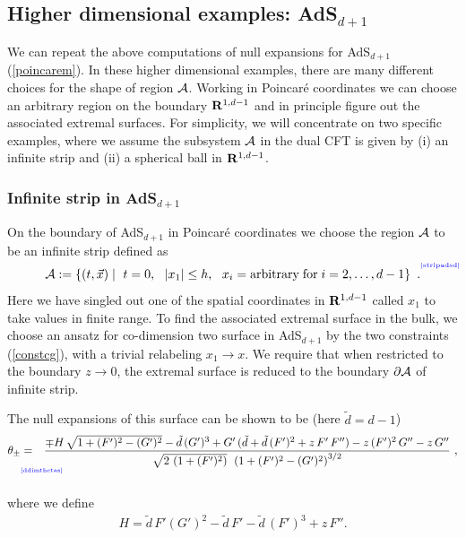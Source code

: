 \documentclass[12pt]{article}
\def\req#1{(\ref{#1})}
\def\({\left (}
\def\){\right )}
\def\p{\partial}
\def\s{\sigma}
\def\CA{{\cal A}}
\def\R{{\bf R}}
\def\p{\partial}
\def\f#1#2{{\frac{#1}{#2}}}
\def\f#1#2{{\frac{#1}{#2}}}
\def\p{\partial}
\def\Label#1{\label{#1}%
{ \color{blue}{\smash{\hbox to0pt{\raise2ex\hbox{\tiny[#1]}\hss}}}}}
\def\rA{\CA}
\def\brA{\p \CA}
\def\ads#1{AdS$_{#1}$}
\def\s{\sqrt}
\def\f {\frac}
\def\ti{\tilde}
\def\no{\nonumber \\}
\begin{document}
\subsection{Higher dimensional examples: AdS$_{d+1}$}
\label{highdex}

We can repeat the above computations of null expansions
for AdS$_{d+1}$ \req{poincarem}. In these higher dimensional examples,
there are many different choices for the shape of region $\rA$.
Working in Poincar\'e coordinates we can choose an arbitrary region
on the boundary $\R^{1,d-1}$ and in principle figure out the
associated extremal surfaces. For simplicity, we will concentrate on
two  specific examples, where we assume the subsystem $\rA$ in the
dual CFT is given by (i) an infinite strip  and (ii) a spherical
ball in $\R^{1,d-1}$.

\subsubsection{Infinite strip in AdS$_{d+1}$}
\label{inst}

On the boundary of \ads{d+1} in Poincar\'e coordinates we choose the region $\rA$ to be an infinite strip defined as
%
\begin{equation}
 \rA := \left\{ (t, \vec{ x }) \mid \ t = 0 , \ \  |x_1| \le h,\ \   x_i =
 {\rm arbitrary\; for}\;  i = 2, \ldots, d-1 \right\} \ .
\Label{stripadsd}
\end{equation}
 Here we have singled out one of the spatial coordinates in $\R^{1,d-1}$ called $x_1$ to take values in  finite range. To find the associated extremal surface in the bulk, we choose an ansatz for co-dimension two surface in AdS$_{d+1}$ by
the two constraints \req{constcg}, with a trivial relabeling $x_1 \to x$.  We require that when restricted to the boundary $z\to 0$, the extremal surface  is reduced to the boundary $\brA$ of infinite strip.


The null expansions of this surface can be shown to be  (here $\ti{d}=d-1$)
%
\begin{eqnarray}
\theta_\pm &=& \f{\mp H\,\s{1+(F')^2-(G')^2} -\ti{d}\,(G')^3+G'\,
(\ti{d} +\ti{d}\, (F')^2+z\, F'\, F'')-z\,(F')^2\,G''-z\,G''}{\s{2
\, \(1+(F')^2\)}\, \; \(1+(F')^2-(G')^2\)^{3/2}} \ , \no
\Label{ddimthetas}
\end{eqnarray}
%
where we define
\begin{eqnarray}
H=\ti{d}\,F'(G')^2-\ti{d}\,F'-\ti{d}\, (F')^3+z \,F''.
\end{eqnarray}
%
\end{document}
